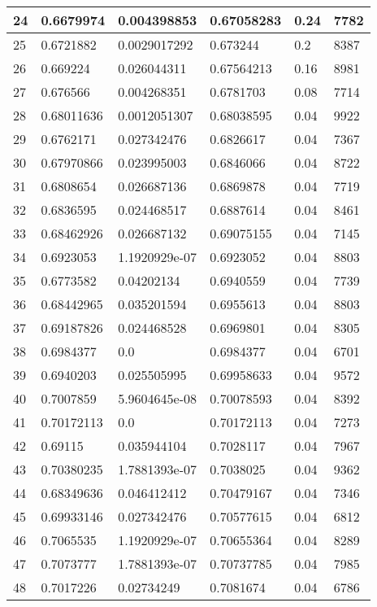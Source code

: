 \begin{longtable}{|l|l|l|l|l|l|}
24 & 0.6679974 & 0.004398853 & 0.67058283 & 0.24 & 7782 \\ \hline 
25 & 0.6721882 & 0.0029017292 & 0.673244 & 0.2 & 8387 \\ \hline 
26 & 0.669224 & 0.026044311 & 0.67564213 & 0.16 & 8981 \\ \hline 
27 & 0.676566 & 0.004268351 & 0.6781703 & 0.08 & 7714 \\ \hline 
28 & 0.68011636 & 0.0012051307 & 0.68038595 & 0.04 & 9922 \\ \hline 
29 & 0.6762171 & 0.027342476 & 0.6826617 & 0.04 & 7367 \\ \hline 
30 & 0.67970866 & 0.023995003 & 0.6846066 & 0.04 & 8722 \\ \hline 
31 & 0.6808654 & 0.026687136 & 0.6869878 & 0.04 & 7719 \\ \hline 
32 & 0.6836595 & 0.024468517 & 0.6887614 & 0.04 & 8461 \\ \hline 
33 & 0.68462926 & 0.026687132 & 0.69075155 & 0.04 & 7145 \\ \hline 
34 & 0.6923053 & 1.1920929e-07 & 0.6923052 & 0.04 & 8803 \\ \hline 
35 & 0.6773582 & 0.04202134 & 0.6940559 & 0.04 & 7739 \\ \hline 
36 & 0.68442965 & 0.035201594 & 0.6955613 & 0.04 & 8803 \\ \hline 
37 & 0.69187826 & 0.024468528 & 0.6969801 & 0.04 & 8305 \\ \hline 
38 & 0.6984377 & 0.0 & 0.6984377 & 0.04 & 6701 \\ \hline 
39 & 0.6940203 & 0.025505995 & 0.69958633 & 0.04 & 9572 \\ \hline 
40 & 0.7007859 & 5.9604645e-08 & 0.70078593 & 0.04 & 8392 \\ \hline 
41 & 0.70172113 & 0.0 & 0.70172113 & 0.04 & 7273 \\ \hline 
42 & 0.69115 & 0.035944104 & 0.7028117 & 0.04 & 7967 \\ \hline 
43 & 0.70380235 & 1.7881393e-07 & 0.7038025 & 0.04 & 9362 \\ \hline 
44 & 0.68349636 & 0.046412412 & 0.70479167 & 0.04 & 7346 \\ \hline 
45 & 0.69933146 & 0.027342476 & 0.70577615 & 0.04 & 6812 \\ \hline 
46 & 0.7065535 & 1.1920929e-07 & 0.70655364 & 0.04 & 8289 \\ \hline 
47 & 0.7073777 & 1.7881393e-07 & 0.70737785 & 0.04 & 7985 \\ \hline 
48 & 0.7017226 & 0.02734249 & 0.7081674 & 0.04 & 6786 \\ \hline 

\end{longtable}
